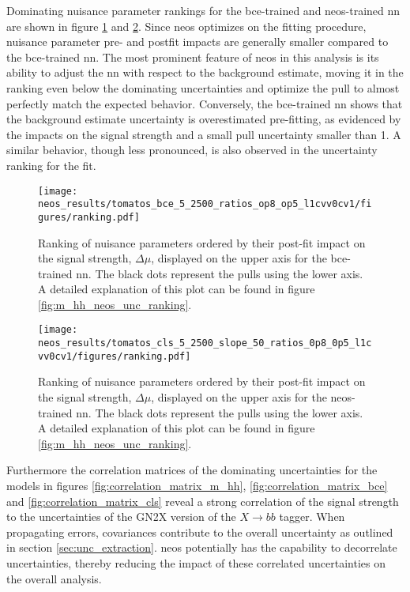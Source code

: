 Dominating nuisance parameter rankings for the \ac{bce}-trained and neos-trained \ac{nn} are shown in figure \ref{fig:neos_valid_ranking_bce} and \ref{fig:neos_valid_ranking_cls}. Since \ac{neos} optimizes on the fitting procedure, nuisance parameter pre- and postfit impacts are generally smaller compared to the \ac{bce}-trained \ac{nn}. The most prominent feature of \ac{neos} in this analysis is its ability to adjust the \ac{nn} with respect to the background estimate, moving it in the ranking even below the dominating uncertainties and optimize the pull to almost perfectly match the expected behavior. Conversely, the \ac{bce}-trained \ac{nn} shows that the background estimate uncertainty is overestimated pre-fitting, as evidenced by the impacts on the signal strength and a small pull uncertainty smaller than 1. A similar behavior, though less pronounced, is also observed in the uncertainty ranking for the \mhh fit.

\begin{figure}
    \centering
    \texttt{[image: neos\_results/tomatos\_bce\_5\_2500\_ratios\_op8\_op5\_l1cvv0cv1/figures/ranking.pdf]}
    \caption[]{Ranking of nuisance parameters ordered by their post-fit impact on the signal strength, $\Delta\mu$, displayed on the upper axis for the \ac{bce}-trained \ac{nn}. The black dots represent the pulls using the lower axis. A detailed explanation of this plot can be found in figure \ref{fig:m_hh_neos_unc_ranking}.}
    \label{fig:neos_valid_ranking_bce}
\end{figure}
\begin{figure}
    \centering
    \texttt{[image: neos\_results/tomatos\_cls\_5\_2500\_slope\_50\_ratios\_0p8\_0p5\_l1cvv0cv1/figures/ranking.pdf]}
    \caption[]{Ranking of nuisance parameters ordered by their post-fit impact on the signal strength, $\Delta\mu$, displayed on the upper axis for the \ac{neos}-trained \ac{nn}. The black dots represent the pulls using the lower axis. A detailed explanation of this plot can be found in figure \ref{fig:m_hh_neos_unc_ranking}.}
    \label{fig:neos_valid_ranking_cls}
\end{figure}

Furthermore the correlation matrices of the dominating uncertainties for the models in figures \ref{fig:correlation_matrix_m_hh}, \ref{fig:correlation_matrix_bce} and \ref{fig:correlation_matrix_cls} reveal a strong correlation of the signal strength to the uncertainties of the GN2X version of the $X\rightarrow bb$ tagger. When propagating errors, covariances contribute to the overall uncertainty as outlined in section \ref{sec:unc_extraction}. \ac{neos} potentially has the capability to decorrelate uncertainties, thereby reducing the impact of these correlated uncertainties on the overall analysis.

